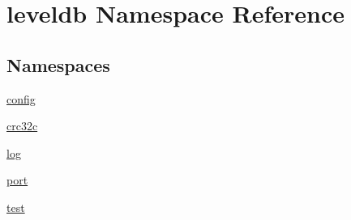 \hypertarget{namespaceleveldb}{\section{leveldb Namespace Reference}
\label{namespaceleveldb}
}
\subsection*{Namespaces}
\begin{DoxyCompactItemize}
\item 
\hyperlink{namespaceleveldb_1_1config}{config}
\item 
\hyperlink{namespaceleveldb_1_1crc32c}{crc32c}
\item 
\hyperlink{namespaceleveldb_1_1log}{log}
\item 
\hyperlink{namespaceleveldb_1_1port}{port}
\item 
\hyperlink{namespaceleveldb_1_1test}{test}
\end{DoxyCompactItemize}
